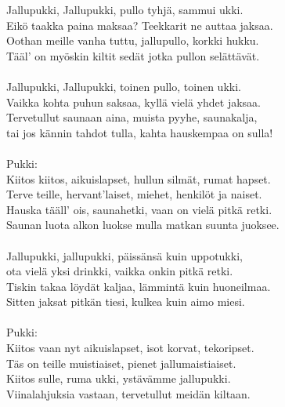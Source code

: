
            Jallupukki, Jallupukki, pullo tyhjä, sammui ukki. \\
            Eikö taakka paina maksaa? Teekkarit ne auttaa jaksaa. \\
            Oothan meille vanha tuttu, jallupullo, korkki hukku. \\
            Tääl' on myöskin kiltit sedät jotka pullon selättävät. \\
\hspace{10mm} \\
            Jallupukki, Jallupukki, toinen pullo, toinen ukki.  \\
            Vaikka kohta puhun saksaa, kyllä vielä yhdet jaksaa. \\
            Tervetullut saunaan aina, muista pyyhe, saunakalja,  \\
            tai jos kännin tahdot tulla, kahta hauskempaa on sulla! \\
\hspace{10mm} \\
            Pukki: \\
            Kiitos kiitos, aikuislapset, hullun silmät, rumat hapset. \\
            Terve teille, hervant'laiset, miehet, henkilöt ja naiset. \\
            Hauska tääll' ois, saunahetki, vaan on vielä pitkä retki. \\
            Saunan luota alkon luokse mulla matkan suunta juoksee. \\
\hspace{10mm} \\
            Jallupukki, jallupukki, päissänsä kuin uppotukki, \\
            ota vielä yksi drinkki, vaikka onkin pitkä retki. \\
            Tiskin takaa löydät kaljaa, lämmintä kuin huoneilmaa. \\
            Sitten jaksat pitkän tiesi, kulkea kuin aimo miesi. \\
\hspace{10mm} \\
            Pukki: \\
            Kiitos vaan nyt aikuislapset, isot korvat, tekoripset. \\
            Täs on teille muistiaiset, pienet jallumaistiaiset. \\
            Kiitos sulle, ruma ukki, ystävämme jallupukki. \\
            Viinalahjuksia vastaan, tervetullut meidän kiltaan. \\
